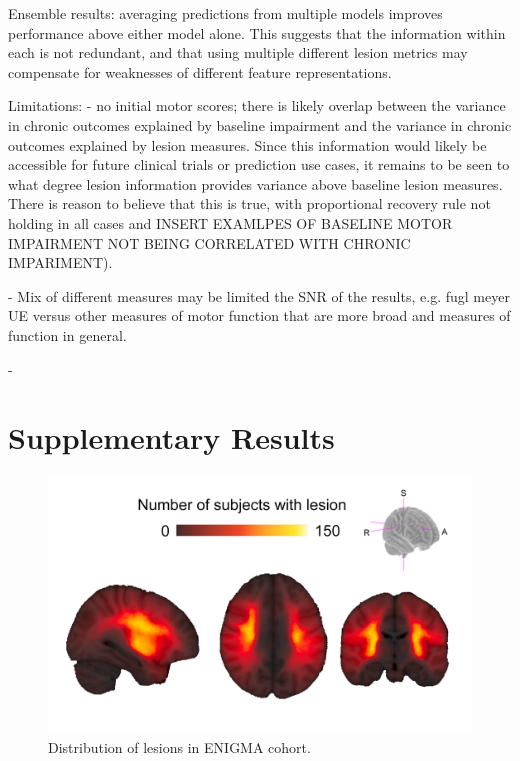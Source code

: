 \documentclass[10pt]{article}
\newcommand{\beginsupplement}{%
\setcounter{table}{0}
\renewcommand{\thetable}{S\arabic{table}}%
\setcounter{figure}{0}
\renewcommand{\thefigure}{S\arabic{figure}}%
}
\begin{document}
Ensemble results: averaging predictions from multiple models improves performance above either model alone. This suggests that the information within each is not redundant, and that using multiple different lesion metrics may compensate for weaknesses of different feature representations. 

Limitations:
- no initial motor scores; there is likely overlap between the variance in chronic outcomes explained by baseline impairment and the variance in chronic outcomes explained by lesion measures. Since this information would likely be accessible for future clinical trials or prediction use cases, it remains to be seen to what degree lesion information provides variance above baseline lesion measures. There is reason to believe that this is true, with proportional recovery rule not holding in all cases and INSERT EXAMLPES OF BASELINE MOTOR IMPAIRMENT NOT BEING CORRELATED WITH CHRONIC IMPARIMENT).

- Mix of different measures may be limited the SNR of the results, e.g. fugl meyer UE versus other measures of motor function that are more broad and measures of function in general. 

- 

\clearpage



\printbibliography
\section*{Supplementary Results}

\beginsupplement
\begin{figure}[ht]
\centering
\includegraphics[width=0.8\linewidth]{figures/distribution_lesions.png}
\caption{Distribution of lesions in ENIGMA cohort.}
\label{lesiondist}
\end{figure}
\end{document}
